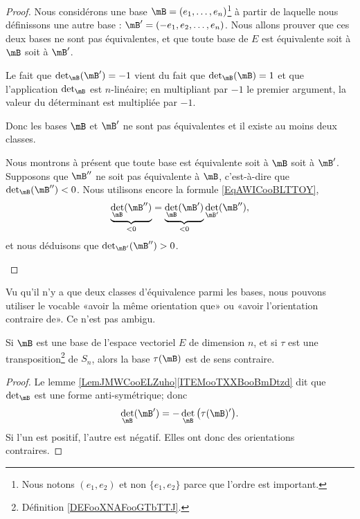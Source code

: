 \begin{proof}
	Nous considérons une base \( \mB=(e_1,\ldots, e_n)\)\footnote{Nous notons \( (e_1,e_2)\) et non \( \{ e_1,e_2 \}\) parce que l'ordre est important.} à partir de laquelle nous définissons une autre base : \( \mB'=( -e_1,e_2,\ldots, e_n )\). Nous allons prouver que ces deux bases ne sont pas équivalentes, et que toute base de \( E\) est équivalente soit à \( \mB\) soit à \( \mB'\).

	\begin{subproof}
		Le fait que \( \det_{\mB}(\mB')=-1\) vient du fait que \( \det_{\mB}(\mB)=1\) et que l'application \( \det_{\mB}\) est \( n\)-linéaire; en multipliant par \( -1\) le premier argument, la valeur du déterminant est multipliée par \( -1\).

		Donc les bases \( \mB\) et \( \mB'\) ne sont pas équivalentes et il existe au moins deux classes.

		Nous montrons à présent que toute base est équivalente soit à \( \mB\) soit à \( \mB'\). Supposons que \( \mB''\) ne soit pas équivalente à \( \mB\), c'est-à-dire que \( \det_{\mB}(\mB'')<0\). Nous utilisons encore la formule \eqref{EqAWICooBLTTOY},
		\begin{equation}
			\underbrace{\det_{\mB}(\mB'')}_{<0}=\underbrace{\det_{\mB}(\mB')}_{<0}\det_{\mB'}(\mB''),
		\end{equation}
		et nous déduisons que \( \det_{\mB'}(\mB'')>0\).
	\end{subproof}
\end{proof}

\begin{normaltext}
	Vu qu'il n'y a que deux classes d'équivalence parmi les bases, nous pouvons utiliser le vocable «avoir la même orientation que» ou «avoir l'orientation contraire de». Ce n'est pas ambigu.
\end{normaltext}

\begin{proposition}
	Si \( \mB\) est une base de l'espace vectoriel \( E\) de dimension \( n\), et si \( \tau\) est une transposition\footnote{Définition \ref{DEFooXNAFooGTbTTJ}.} de \( S_n\), alors la base \( \tau(\mB)\) est de sens contraire.
\end{proposition}

\begin{proof}
	Le lemme \ref{LemJMWCooELZuho}\ref{ITEMooTXXBooBmDtzd} dit que \( \det_{\mB}\) est une forme anti-symétrique; donc
	\begin{equation}
		\det_{\mB}(\mB')=-\det_{\mB}\big( \tau(\mB)' \big).
	\end{equation}
	Si l'un est positif, l'autre est négatif. Elles ont donc des orientations contraires.
\end{proof}


